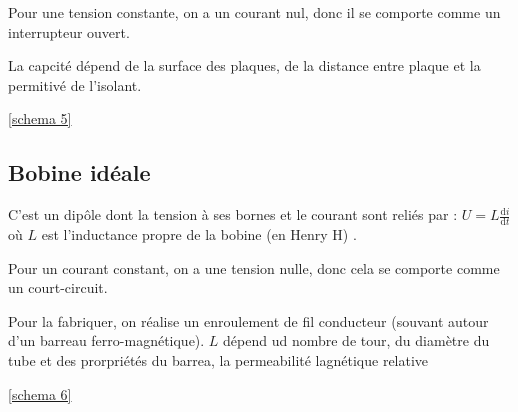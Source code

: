 \documentclass[french]{yLectureNote}
\begin{document}
Pour une tension constante, on a un courant nul, donc il se comporte comme un interrupteur ouvert.


La capcité dépend de la surface des plaques, de la distance entre plaque et la permitivé de l'isolant.

\ref{schema 5}
\subsection{Bobine idéale}
C'est un dip\^ole dont la tension à ses bornes et le courant sont reliés par : \(U = L \frac{\mathrm{d}i}{\mathrm{d}t}\) où $L$ est l'inductance propre de la bobine (en Henry H) .

Pour un courant constant, on a une tension nulle, donc cela se comporte comme un court-circuit.

Pour la fabriquer, on réalise un enroulement de fil conducteur (souvant autour d'un barreau ferro-magnétique). \(L\) dépend ud nombre de tour, du diamètre du tube et des prorpriétés du barrea, la permeabilité lagnétique relative

\ref{schema 6}
\end{document}
